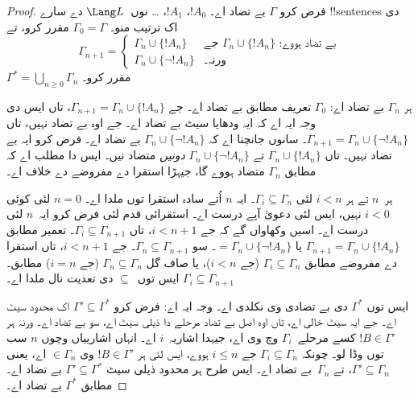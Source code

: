\documentclass[../../../include/open-logic-section]{subfiles}
\begin{document}
\begin{proof}
فرض کرو $\Gamma$ بے تضاد اے۔ $!A_0$، $!A_1$،
\dots{} نوں~$\Lang L$ دے سارے !!{sentence}s دی اک
ترتیب منو۔ $\Gamma_0 = \Gamma$ مقرر کرو، تے
\[
\Gamma_{n+1} =
\begin{cases}
\Gamma_n \cup \{ !A_n \} & \textrm{جے $\Gamma_n \cup \{!A_n\}$ بے
  تضاد ہووے؛} \\
\Gamma_n \cup \{ \lnot !A_n \} & \textrm{ورنہ۔}
\end{cases}
\]
$\Gamma^* = \bigcup_{n \geq 0} \Gamma_n$ مقرر کرو۔

ہر $\Gamma_n$ بے تضاد اے: $\Gamma_0$ تعریف مطابق
بے تضاد اے۔ جے $\Gamma_{n+1} = \Gamma_n \cup \{!A_n\}$،
تاں ایس دی وجہ ایہ اے کہ ایہ ودھایا سیٹ بے تضاد اے۔
جے اوہ بے تضاد نہیں، تاں
$\Gamma_{n+1} = \Gamma_n \cup \{\lnot !A_n\}$۔
سانوں جانچنا اے کہ $\Gamma_n \cup \{\lnot !A_n\}$
بے تضاد اے۔ فرض کرو ایہ بے تضاد نہیں۔ تاں
$\Gamma_n \cup \{!A_n\}$ تے
$\Gamma_n \cup \{\lnot !A_n\}$ \emph{دونیں}
متضاد نیں۔ ایس دا مطلب اے کہ
مطابق $\Gamma_n$ متضاد ہووے گا، جیہڑا استقرا دے
مفروضے دے خلاف اے۔

ہر~$n$ تے ہر $i < n$ لئی $\Gamma_i \subseteq \Gamma_n$۔
ایہ $n$ اُتے سادہ استقرا توں ملدا اے۔ $n=0$ لئی
کوئی $i < 0$ نہیں، ایس لئی دعویٰ آپے درست اے۔
استقرائی قدم لئی فرض کرو ایہ~$n$ لئی درست اے۔
اسیں وکھاواں گے کہ جے $i < n+1$، تاں
$\Gamma_i \subseteq \Gamma_{n+1}$۔
تعمیر مطابق $\Gamma_{n+1} = \Gamma_n \cup \{!A_n\}$
یا $=
\Gamma_n \cup \{\lnot !A_n\}$۔
سو $\Gamma_n \subseteq \Gamma_{n+1}$۔
جے $i < n+1$، تاں استقرا دے مفروضے مطابق
$\Gamma_i \subseteq \Gamma_n$ (جے $i < n$)،
یا صاف گل $\Gamma_n
\subseteq \Gamma_n$ (جے $i = n$) مطابق۔
$\Gamma_i \subseteq
\Gamma_{n+1}$ ایس توں~$\subseteq$ دی تعدیت نال ملدا اے۔

ایس توں $\Gamma^*$ دی بے تضادی وی نکلدی اے۔
وجہ ایہ اے: فرض کرو $\Gamma' \subseteq \Gamma^*$
اک محدود سیٹ اے۔
جے ایہ سیٹ خالی اے، تاں اوہ اصل بے تضاد مرحلے دا ذیلی سیٹ اے، سو بے تضاد اے۔ ورنہ ہر $!B \in \Gamma'$ کسے
مرحلے~$\Gamma_i$ وچ وی اے، جیہدا اشاریہ~$i$ اے۔
انہاں اشارییاں وچوں
$n$ سب توں وڈا لو۔ چونکہ
$\Gamma_i \subseteq \Gamma_n$ جے $i \le n$ ہووے،
ایس لئی ہر
$!B \in \Gamma'$ وی $\in \Gamma_n$ اے،
یعنی $\Gamma' \subseteq \Gamma_n$، تے
$\Gamma_n$~بے تضاد اے۔ ایس طرح ہر محدود ذیلی
سیٹ $\Gamma' \subseteq
\Gamma^*$ بے تضاد اے۔
مطابق $\Gamma^*$ بے تضاد اے۔


\end{proof}
\end{document}
